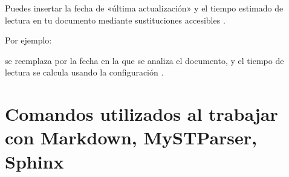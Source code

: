 \documentclass[a4paper,10pt,spanish]{sphinxmanual}
\begin{document}
\sphinxAtStartPar
Puedes insertar la fecha de «última actualización» y el tiempo estimado de lectura en tu documento mediante sustituciones accesibles  .

\sphinxAtStartPar
Por ejemplo:

\begin{sphinxVerbatim}[commandchars=\\\{\}]
\end{sphinxVerbatim}

\sphinxAtStartPar
{} se reemplaza por la fecha en la que se analiza el documento, y el tiempo de lectura se calcula usando la configuración .

\sphinxstepscope


\section{Comandos utilizados al trabajar con Markdown, MyST\sphinxhyphen{}Parser, Sphinx}
\label{\detokenize{comandos_mas_usados/comandos:comandos-utilizados-al-trabajar-con-markdown-myst-parser-sphinx}}\label{\detokenize{comandos_mas_usados/comandos::doc}}

\subsection{}
\label{\detokenize{comandos_mas_usados/comandos:crear-un-entorno-virtual}}
\begin{sphinxVerbatim}[commandchars=\\\{\}]
   
\end{sphinxVerbatim}


\subsection{}
\label{\detokenize{comandos_mas_usados/comandos:activar-el-entorno-virtual}}
\begin{sphinxVerbatim}[commandchars=\\\{\}]
\PYGZbs{}\PYGZbs{}
\end{sphinxVerbatim}
\end{document}
